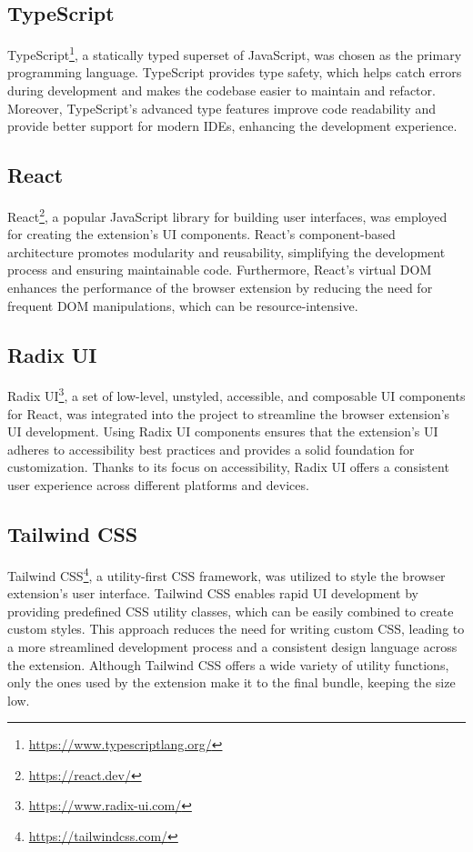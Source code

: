 \subsection{TypeScript}

TypeScript\footnote{\url{https://www.typescriptlang.org/}}, a statically typed superset of JavaScript, was chosen as the primary programming language. TypeScript provides type safety, which helps catch errors during development and makes the codebase easier to maintain and refactor. Moreover, TypeScript's advanced type features improve code readability and provide better support for modern IDEs, enhancing the development experience.

\subsection{React}

React\footnote{\url{https://react.dev/}}, a popular JavaScript library for building user interfaces, was employed for creating the extension's UI components. React's component-based architecture promotes modularity and reusability, simplifying the development process and ensuring maintainable code. Furthermore, React's virtual DOM enhances the performance of the browser extension by reducing the need for frequent DOM manipulations, which can be resource-intensive.

\subsection{Radix UI}

Radix UI\footnote{\url{https://www.radix-ui.com/}}, a set of low-level, unstyled, accessible, and composable UI components for React, was integrated into the project to streamline the browser extension's UI development. Using Radix UI components ensures that the extension's UI adheres to accessibility best practices and provides a solid foundation for customization. Thanks to its focus on accessibility, Radix UI offers a consistent user experience across different platforms and devices.

\subsection{Tailwind CSS}

Tailwind CSS\footnote{\url{https://tailwindcss.com/}}, a utility-first CSS framework, was utilized to style the browser extension's user interface. Tailwind CSS enables rapid UI development by providing predefined CSS utility classes, which can be easily combined to create custom styles. This approach reduces the need for writing custom CSS, leading to a more streamlined development process and a consistent design language across the extension. Although Tailwind CSS offers a wide variety of utility functions, only the ones used by the extension make it to the final bundle, keeping the size low.

